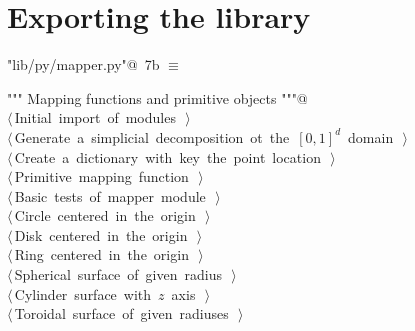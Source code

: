 \documentclass[11pt,oneside]{article}	%
\begin{document}
\section{Exporting the library}
\begin{flushleft} \small \label{scrap16}
\protect{}\verb@"lib/py/mapper.py"@\nobreak\ {\footnotesize 7b }$\equiv$
\vspace{-1ex}
\begin{list}{}{} \item
\mbox{}\verb@""" Mapping functions and primitive objects """@\\
\mbox{}\verb@@\hbox{$\langle\,$Initial import of modules\nobreak\ {\footnotesize {}}$\,\rangle$}\verb@@\\
\mbox{}\verb@@\hbox{$\langle\,$Generate a simplicial decomposition ot the $[0,1]^d$ domain\nobreak\ {\footnotesize {}}$\,\rangle$}\verb@@\\
\mbox{}\verb@@\hbox{$\langle\,$Create a dictionary with key the point location\nobreak\ {\footnotesize {}}$\,\rangle$}\verb@@\\
\mbox{}\verb@@\hbox{$\langle\,$Primitive mapping function\nobreak\ {\footnotesize {}}$\,\rangle$}\verb@@\\
\mbox{}\verb@@\hbox{$\langle\,$Basic tests of mapper module\nobreak\ {\footnotesize {}}$\,\rangle$}\verb@@\\
\mbox{}\verb@@\hbox{$\langle\,$Circle centered in the origin\nobreak\ {\footnotesize {}}$\,\rangle$}\verb@@\\
\mbox{}\verb@@\hbox{$\langle\,$Disk centered in the origin\nobreak\ {\footnotesize {}}$\,\rangle$}\verb@@\\
\mbox{}\verb@@\hbox{$\langle\,$Ring centered in the origin\nobreak\ {\footnotesize {}}$\,\rangle$}\verb@@\\
\mbox{}\verb@@\hbox{$\langle\,$Spherical surface of given radius\nobreak\ {\footnotesize {}}$\,\rangle$}\verb@@\\
\mbox{}\verb@@\hbox{$\langle\,$Cylinder surface with $z$ axis\nobreak\ {\footnotesize {}}$\,\rangle$}\verb@@\\
\mbox{}\verb@@\hbox{$\langle\,$Toroidal surface of given radiuses\nobreak\ {\footnotesize {}}$\,\rangle$}\verb@@\\

\end{list}
\end{flushleft}
\end{document}
